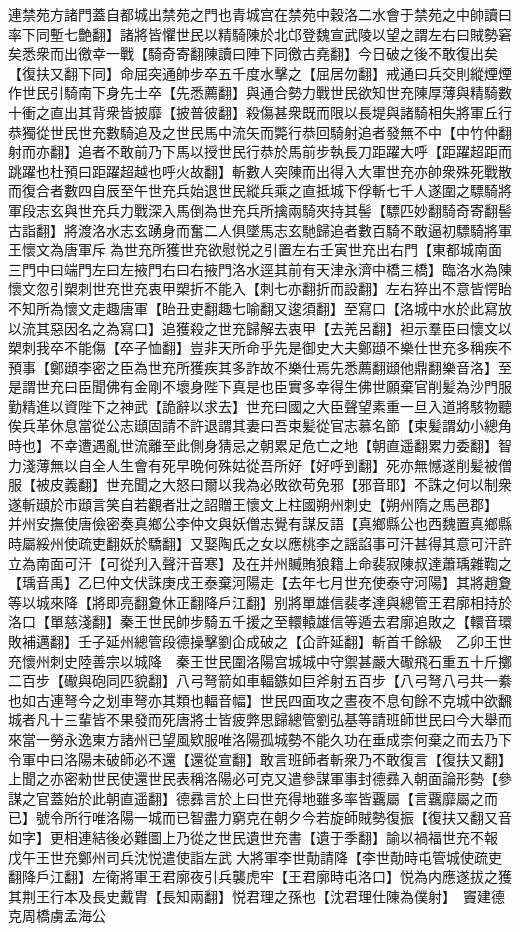 連禁苑方諸門蓋自都城出禁苑之門也青城宫在禁苑中穀洛二水會于禁苑之中帥讀曰率下同塹七艶翻】諸將皆懼世民以精騎陳於北邙登魏宣武陵以望之謂左右曰賊勢窘矣悉衆而出徼幸一戰【騎奇寄翻陳讀曰陣下同徼古堯翻】今日破之後不敢復出矣【復扶又翻下同】命屈突通帥步卒五千度水擊之【屈居勿翻】戒通曰兵交則縱煙煙作世民引騎南下身先士卒【先悉薦翻】與通合勢力戰世民欲知世充陳厚薄與精騎數十衝之直出其背衆皆披靡【披普彼翻】殺傷甚衆既而限以長堤與諸騎相失將軍丘行恭獨從世民世充數騎追及之世民馬中流矢而斃行恭回騎射追者發無不中【中竹仲翻射而亦翻】追者不敢前乃下馬以授世民行恭於馬前步執長刀距躍大呼【距躍超距而跳躍也杜預曰距躍超越也呼火故翻】斬數人突陳而出得入大軍世充亦帥衆殊死戰散而復合者數四自辰至午世充兵始退世民縱兵乘之直抵城下俘斬七千人遂圍之驃騎將軍段志玄與世充兵力戰深入馬倒為世充兵所擒兩騎夾持其髻【驃匹妙翻騎奇寄翻髻古詣翻】將渡洛水志玄踴身而奮二人俱墜馬志玄馳歸追者數百騎不敢逼初驃騎將軍王懷文為唐軍斥為世充所獲世充欲慰悦之引置左右壬寅世充出右門【東都城南面三門中曰端門左曰左掖門右曰右掖門洛水逕其前有天津永濟中橋三橋】臨洛水為陳懷文忽引槊刺世充世充衷甲槊折不能入【刺七亦翻折而設翻】左右猝出不意皆愕眙不知所為懷文走趣唐軍【眙丑吏翻趣七喻翻又逡須翻】至寫口【洛城中水於此寫放以流其惡因名之為寫口】追獲殺之世充歸解去衷甲【去羌呂翻】袒示羣臣曰懷文以槊刺我卒不能傷【卒子恤翻】豈非天所命乎先是御史大夫鄭頲不樂仕世充多稱疾不預事【鄭頲李密之臣為世充所獲疾其多詐故不樂仕焉先悉薦翻頲他鼎翻樂音洛】至是謂世充曰臣聞佛有金剛不壞身陛下真是也臣實多幸得生佛世願棄官削髪為沙門服勤精進以資陛下之神武【詭辭以求去】世充曰國之大臣聲望素重一旦入道將駭物聽俟兵革休息當從公志頲固請不許退謂其妻曰吾束髪從官志慕名節【束髪謂幼小總角時也】不幸遭遇亂世流離至此側身猜忌之朝累足危亡之地【朝直遥翻累力委翻】智力淺薄無以自全人生會有死早晩何殊姑從吾所好【好呼到翻】死亦無憾遂削髪被僧服【被皮義翻】世充聞之大怒曰爾以我為必敗欲苟免邪【邪音耶】不誅之何以制衆遂斬頲於市頲言笑自若觀者壯之詔贈王懷文上柱國朔州刺史【朔州隋之馬邑郡】　并州安撫使唐儉密奏真鄉公李仲文與妖僧志覺有謀反語【真鄉縣公也西魏置真鄉縣時屬綏州使疏吏翻妖於驕翻】又娶陶氏之女以應桃李之謡諂事可汗甚得其意可汗許立為南面可汗【可從刋入聲汗音寒】及在并州贓賄狼籍上命裴寂陳叔達蕭瑀雜鞫之【瑀音禹】乙巳仲文伏誅庚戌王泰棄河陽走【去年七月世充使泰守河陽】其將趙夐等以城來降【將即亮翻夐休正翻降戶江翻】别將單雄信裴孝達與總管王君廓相持於洛口【單慈淺翻】秦王世民帥步騎五千援之至轘轅雄信等遁去君廓追敗之【轘音環敗補邁翻】壬子延州總管段德操擊劉仚成破之【仚許延翻】斬首千餘級　乙卯王世充懷州刺史陸善宗以城降　秦王世民圍洛陽宫城城中守禦甚嚴大礮飛石重五十斤擲二百步【礮與砲同匹貌翻】八弓弩箭如車輻鏃如巨斧射五百步【八弓弩八弓共一絭也如古連弩今之划車弩亦其類也輻音幅】世民四面攻之晝夜不息旬餘不克城中欲飜城者凡十三輩皆不果發而死唐將士皆疲弊思歸總管劉弘基等請班師世民曰今大舉而來當一勞永逸東方諸州已望風欵服唯洛陽孤城勢不能久功在垂成柰何棄之而去乃下令軍中曰洛陽未破師必不還【還從宣翻】敢言班師者斬衆乃不敢復言【復扶又翻】上聞之亦密勑世民使還世民表稱洛陽必可克又遣參謀軍事封德彞入朝面論形勢【參謀之官蓋始於此朝直遥翻】德彞言於上曰世充得地雖多率皆覊屬【言覊靡屬之而已】號令所行唯洛陽一城而已智盡力窮克在朝夕今若旋師賊勢復振【復扶又翻又音如字】更相連結後必難圖上乃從之世民遺世充書【遺于季翻】諭以禍福世充不報　戊午王世充鄭州司兵沈悦遣使詣左武大將軍李世勣請降【李世勣時屯管城使疏吏翻降戶江翻】左衛將軍王君廓夜引兵襲虎牢【王君廓時屯洛口】悦為内應遂拔之獲其荆王行本及長史戴胄【長知兩翻】悦君理之孫也【沈君理仕陳為僕射】　竇建德克周橋虜孟海公

